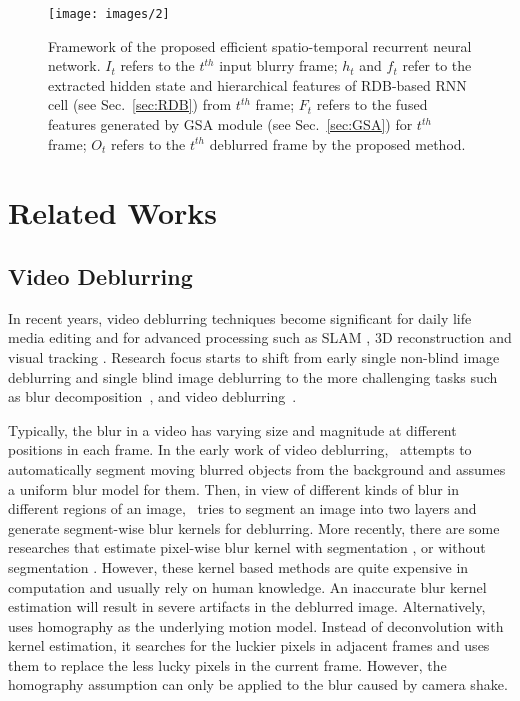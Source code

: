 \documentclass[twocolumn]{svjour3}          \smartqed  \usepackage{graphicx}
\begin{document}
\begin{figure*}[!t]
	\centering
	\texttt{[image: images/2]}
	\caption{Framework of the proposed efficient spatio-temporal recurrent neural network. $I_t$ refers to the $t^{th}$ input blurry frame; $h_t$ and $f_t$ refer to the extracted hidden state and hierarchical features of RDB-based RNN cell (see Sec.~\ref{sec:RDB}) from $t^{th}$ frame; $F_t$ refers to the fused features generated by GSA module (see Sec.~\ref{sec:GSA}) for $t^{th}$ frame; $O_t$ refers to the $t^{th}$ deblurred frame by the proposed method.}
	\label{fig:process}
\end{figure*}

\section{Related Works}
\label{sec:related}
\subsection{Video Deblurring}
\label{sec:related_deblur}
In recent years, video deblurring techniques become significant for daily life media editing and for advanced processing such as SLAM \cite{lee2011simultaneous}, 3D reconstruction \cite{seok2013dense} and visual tracking \cite{wu2011blurred}. Research focus starts to shift from early single non-blind image deblurring \cite{zoran2011learning, schuler2013machine, sun2014good} and single blind image deblurring \cite{xu2010two, goldstein2012blur, michaeli2014blind, chakrabarti2016neural, nimisha2017blur} to the more challenging tasks such as blur decomposition~\cite{jin2018learning,shen2020blurry,zhong2022animation}, and video deblurring~\cite{su2017deep,wang2019edvr,nah2019recurrent,zhou2019spatio,zhong2021towards,wang2022efficient}.

Typically, the blur in a video has varying size and magnitude at different positions in each frame. In the early work of video deblurring,~\cite{bar2007variational} attempts to automatically segment moving blurred objects from the background and assumes a uniform blur model for them. Then, in view of different kinds of blur in different regions of an image,~\cite{wulff2014modeling} tries to segment an image into two layers and generate segment-wise blur kernels for deblurring. More recently, there are some researches that estimate pixel-wise blur kernel with segmentation \cite{ren2017video}, or without segmentation \cite{hyun2014segmentation}. However, these kernel based methods are quite expensive in computation and usually rely on human knowledge. An inaccurate blur kernel estimation will result in severe artifacts in the deblurred image. Alternatively,~\cite{cho2012video} uses homography as the underlying motion model. Instead of deconvolution with kernel estimation, it searches for the luckier pixels in adjacent frames and uses them to replace the less lucky pixels in the current frame. However, the homography assumption can only be applied to the blur caused by camera shake.
\end{document}
